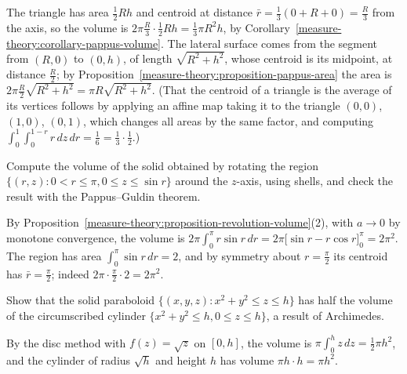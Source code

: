 \begin{solution}
The triangle has area $\frac12Rh$ and centroid at distance $\bar r = \frac13(0 + R + 0) = \frac R3$ from the axis, so the volume is $2\pi\frac R3 \cdot \frac12Rh = \frac13\pi R^2h$, by
Corollary~\ref{measure-theory:corollary-pappus-volume}. The lateral surface comes from the segment from $(R, 0)$ to $(0, h)$, of length $\sqrt{R^2 + h^2}$, whose centroid is its midpoint, at distance $\frac R2$; by
Proposition~\ref{measure-theory:proposition-pappus-area} the area is $2\pi\frac R2\sqrt{R^2 + h^2} = \pi R\sqrt{R^2 + h^2}$. (That the centroid of a triangle is the average of its vertices follows by applying an affine map
taking it to the triangle $(0, 0)$, $(1, 0)$, $(0, 1)$, which changes all areas by the same factor, and computing $\int_0^1\int_0^{1-r}r\,dz\,dr = \frac16 = \frac13 \cdot \frac12$.)
\end{solution}

\begin{exercise}\label{measure-theory:exercise-shells}
Compute the volume of the solid obtained by rotating the region $\{(r, z) : 0 < r \leq \pi, 0 \leq z \leq \sin r\}$ around the $z$-axis, using shells, and check the result with the Pappus--Guldin theorem.
\end{exercise}

\begin{solution}
By Proposition~\ref{measure-theory:proposition-revolution-volume}(2), with $a \to 0$ by monotone convergence, the volume is $2\pi\int_0^\pi r\sin r\,dr = 2\pi\bigl[\sin r - r\cos r\bigr]_0^\pi = 2\pi^2$. The region has area
$\int_0^\pi\sin r\,dr = 2$, and by symmetry about $r = \frac\pi2$ its centroid has $\bar r = \frac\pi2$; indeed $2\pi \cdot \frac\pi2 \cdot 2 = 2\pi^2$.
\end{solution}

\begin{exercise}\label{measure-theory:exercise-paraboloid}
Show that the solid paraboloid $\{(x, y, z) : x^2 + y^2 \leq z \leq h\}$ has half the volume of the circumscribed cylinder $\{x^2 + y^2 \leq h, 0 \leq z \leq h\}$, a result of Archimedes.
\end{exercise}

\begin{solution}
By the disc method with $f(z) = \sqrt z$ on $[0, h]$, the volume is $\pi\int_0^hz\,dz = \frac12\pi h^2$, and the cylinder of radius $\sqrt h$ and height $h$ has volume $\pi h \cdot h = \pi h^2$.
\end{solution}
